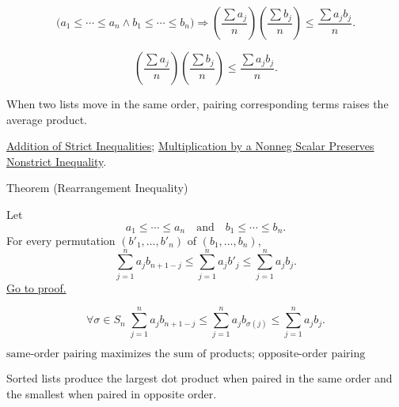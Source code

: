 \begin{remark*}
\[
\bigl(a_1\le\cdots\le a_n\land b_1\le\cdots\le b_n\bigr)
\Rightarrow
\left(\frac{\sum a_j}{n}\right)\left(\frac{\sum b_j}{n}\right)
\le
\frac{\sum a_jb_j}{n}.
\]
\end{remark*}

\begin{remark*}
\[
\left(\frac{\sum a_j}{n}\right)\left(\frac{\sum b_j}{n}\right)
\le
\frac{\sum a_jb_j}{n}.
\]
\end{remark*}

\begin{remark*}[Interpretation]
When two lists move in the same order, pairing corresponding terms raises the
average product.
\end{remark*}

\begin{dependencies}
\hyperref[thm:ineq-add-inequalities]{Addition of Strict Inequalities};
\hyperref[thm:ineq-nonstrict-multiply-nonneg]{Multiplication by a Nonneg Scalar Preserves Nonstrict Inequality}.
\end{dependencies}

\begin{theorembox}{Theorem (Rearrangement Inequality)}
\begin{theorem}
\label{thm:ineq-rearrangement}
Let
\[
a_1\le\cdots\le a_n
\quad\text{and}\quad
b_1\le\cdots\le b_n.
\]
For every permutation $(b'_1,\dots,b'_n)$ of $(b_1,\dots,b_n)$,
\[
\sum_{j=1}^{n}a_jb_{n+1-j}
\le
\sum_{j=1}^{n}a_jb'_j
\le
\sum_{j=1}^{n}a_jb_j.
\]
\hyperref[prf:ineq-rearrangement]{Go to proof.}
\end{theorem}
\end{theorembox}

\begin{remark*}
\[
\forall \sigma\in S_n\;
\sum_{j=1}^{n}a_jb_{n+1-j}
\le
\sum_{j=1}^{n}a_jb_{\sigma(j)}
\le
\sum_{j=1}^{n}a_jb_j.
\]
\end{remark*}

\begin{remark*}
\[
\text{same-order pairing maximizes the sum of products; opposite-order pairing minimizes it.}
\]
\end{remark*}

\begin{remark*}[Interpretation]
Sorted lists produce the largest dot product when paired in the same order
and the smallest when paired in opposite order.
\end{remark*}

